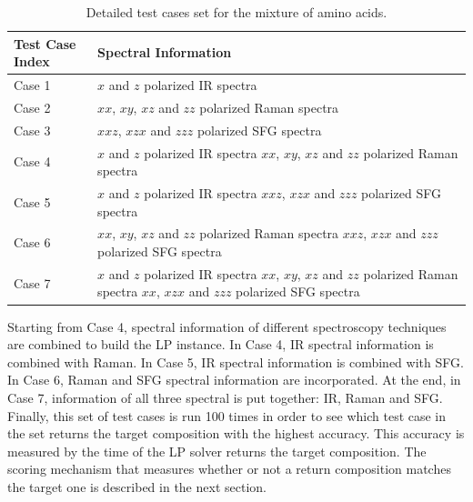 \begin{table}
\begin{center}
{\def\arraystretch{1.5}
\begin{tabular}{| l | p{3in} | }
\hline
Test Case Index & Spectral Information \\
\hline
Case 1 & $x$ and $z$ polarized IR spectra\\
\hline
Case 2 & $xx$, $xy$, $xz$ and $zz$ polarized Raman spectra \\
\hline
Case 3 & $xxz$, $xzx$ and $zzz$ polarized SFG spectra \\
\hline
Case 4 & $x$ and $z$ polarized IR spectra \newline $xx$, $xy$, $xz$ and $zz$ polarized Raman spectra \\
\hline
Case 5 & $x$ and $z$ polarized IR spectra \newline $xxz$, $xzx$ and $zzz$ polarized SFG spectra　\\
\hline
Case 6 & $xx$, $xy$, $xz$ and $zz$ polarized Raman spectra \newline $xxz$, $xzx$ and $zzz$ polarized SFG spectra \\
\hline
Case 7 & $x$ and $z$ polarized IR spectra \newline
 $xx$, $xy$, $xz$ and $zz$ polarized Raman spectra \newline 
 $xx$, $xzx$ and $zzz$ polarized SFG spectra \\
\hline
\end{tabular} 
}
\end{center}
\caption{Detailed test cases set for the mixture of amino acids.} 
\label{tab:5.1} 
\end{table}	

Starting from Case 4, spectral information of different spectroscopy techniques are combined to build the LP instance. In Case 4, IR spectral information is combined with Raman. In Case 5, IR spectral information is combined with SFG. In Case 6, Raman and SFG spectral information are incorporated. At the end, in Case 7, information of all three spectral is put together: IR, Raman and SFG. \\

Finally, this set of test cases is run 100 times in order to see which test case in the set returns the target composition with the highest accuracy. This accuracy is measured by the time of the LP solver returns the target composition. The scoring mechanism that measures whether or not a return composition matches the target one is described in the next section. \\

